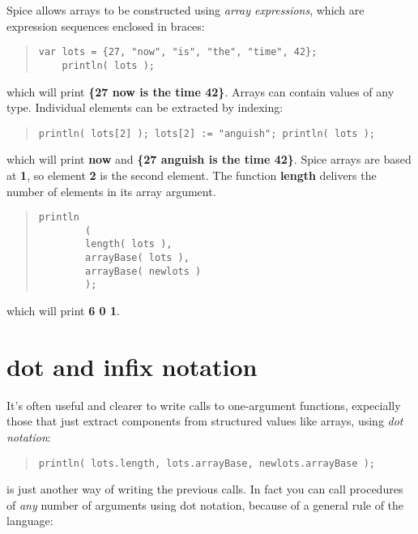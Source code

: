 \documentclass{report}
\begin{document}
Spice allows arrays to be constructed using {\em array expressions}, which are
expression sequences enclosed in braces:

\begin{quote}
\begin{verbatim}
var lots = {27, "now", "is", "the", "time", 42};
    println( lots );
\end{verbatim}
\end{quote}


which will print {\bf \{27 now is the time 42\}}. Arrays can contain values of any
type. Individual elements can be extracted by indexing:

\begin{quote}
\begin{verbatim}
println( lots[2] ); lots[2] := "anguish"; println( lots );
\end{verbatim}
\end{quote}


which will print {\bf now} and {\bf \{27 anguish is the time 42\}}. Spice arrays are
based at {\bf 1}, so element {\bf 2} is the second element. The function
{\bf length} delivers the number of elements in its array argument.

\begin{quote}
\begin{verbatim}
println
        (
        length( lots ),
        arrayBase( lots ),
        arrayBase( newlots )
        );
\end{verbatim}
\end{quote}


which will print {\bf 6 0 1}.\chapter{dot and infix notation}


It's often useful and clearer to write calls to one-argument functions,
expecially those that just extract components from structured values like
arrays, using {\em dot notation}:

\begin{quote}
\begin{verbatim}
println( lots.length, lots.arrayBase, newlots.arrayBase );
\end{verbatim}
\end{quote}


is just another way of writing the previous calls. In fact you can call
procedures of {\em any} number of arguments using dot notation, because of a
general rule of the language:
\end{document}
